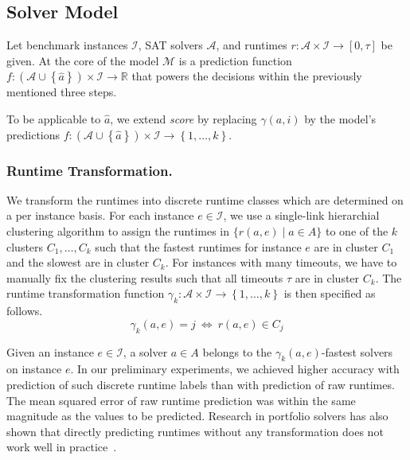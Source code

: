 \documentclass[runningheads]{llncs}
\begin{document}
\subsection{Solver Model}
\label{sec:main-model}



Let benchmark instances $\mathcal{I}$, SAT solvers $\mathcal{A}$, and runtimes $r : \mathcal{A} \times \mathcal{I} \rightarrow \left[0, \tau\right]$ be given. 
At the core of the model $\mathcal{M}$ is a prediction function $f : \left(\mathcal{A} \cup \left\lbrace \hat{a} \right\rbrace\right) \times \mathcal{I} \rightarrow \mathbb{R}$ that powers the decisions within the previously mentioned three steps.

To be applicable to $\hat{a}$, we extend \emph{score} by replacing $\gamma\!\left(a, i\right)$ by the model's predictions $f\!: \left(\mathcal{A} \cup 
\left\lbrace \hat{a} \right\rbrace\right) \times \mathcal{I} \rightarrow \left\lbrace 1, \dots, k \right\rbrace$.


\subsubsection{Runtime Transformation.}

We transform the runtimes into discrete runtime classes which are determined on a per instance basis.
For each instance $e \in \mathcal{I}$, we use a single-link hierarchial clustering algorithm to assign the runtimes in $\bigl\{ r(a, e) \mid a \in A \bigr\}$ to one of the $k$ clusters $C_1, \dots, C_k$ such that the fastest runtimes for instance $e$ are in cluster $C_1$ and the slowest are in cluster $C_k$.
For instances with many timeouts, we have to manually fix the clustering results such that all timeouts $\tau$ are in cluster $C_k$.
The runtime transformation function $\gamma_k : {\mathcal{A} \times \mathcal{I}} \rightarrow \left\lbrace 1, \dots, k \right\rbrace$ is then specified as follows.
$$\gamma_k(a, e) = j ~\Leftrightarrow~ r(a, e) \in C_j$$

Given an instance $e \in \mathcal{I}$, a solver $a \in A$ belongs to the $\gamma_k(a, e)$-fastest solvers on instance $e$. 
In our preliminary experiments, we achieved higher accuracy with prediction of such discrete runtime labels than with prediction of raw runtimes. 
The mean squared error of raw runtime prediction was within the same magnitude as the values to be predicted. 
Research in portfolio solvers has also shown that directly predicting runtimes without any transformation does not work well in practice~\cite{NgokoCT19,CollauttiMMO13}.
\end{document}
